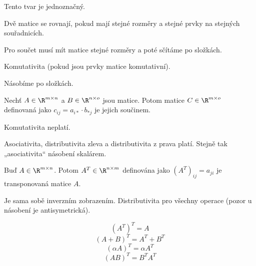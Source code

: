 \documentclass[12pt]{article}					%
\begin{document}
    \begin{poznamka}
        Tento tvar je jednoznačný.
    \end{poznamka}

    \begin{definice}
        Dvě matice se rovnají, pokud mají stejné rozměry a stejné prvky na stejných souřadnicích.
    \end{definice}

    \begin{definice}
        Pro součet musí mít matice stejné rozměry a poté sčítáme po složkách.

        \begin{poznamkain}[Vlastnosti]
            Komutativita (pokud jsou prvky matice komutativní).
        \end{poznamkain}
    \end{definice}

    \begin{definice}
        Násobíme po složkách.
    \end{definice}

    \begin{definice}
        Nechť $A \in \R^{m\times n}$ a $B \in \R^{n \times o}$ jsou matice. Potom matice $C \in \R^{m \times o}$ definovaná jako $c_{ij} = a_{i*}\cdot b_{*j}$ je jejich součinem.

        \begin{poznamkain}[Vlastnosti]
            Komutativita neplatí.

            Asociativita, distributivita zleva a distributivita z prava platí. Stejně tak „asociativita“ násobení skalárem.
        \end{poznamkain}
    \end{definice}

    \begin{definice}[Transpozice]
        Buď $A\in\R^{m \times n}$. Potom $A^T\in \R^{n \times m}$ definována jako $(A^T)_{ij} = a_{ji}$ je transponovaná matice $A$.
        \begin{poznamka}[Vlastnosti]
            Je sama sobě inverzním zobrazením. Distributivita pro všechny operace (pozor u násobení je antisymetrická).

            $$ (A^T)^T = A $$
            $$ (A + B)^T = A^T + B^T $$
            $$ (\alpha A)^T = \alpha A^T $$
            $$ (AB)^T = B^TA^T $$
        \end{poznamka}
    \end{definice}
\end{document}
